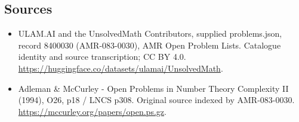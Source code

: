 \documentclass[11pt,a4paper]{article}
\begin{document}
\subsection{Sources}
\begin{itemize}
\item[S1] ULAM.AI and the UnsolvedMath Contributors, supplied problems.json, record 8400030 (AMR-083-0030), AMR Open Problem Lists. Catalogue identity and source transcription; CC BY 4.0.
\url{https://huggingface.co/datasets/ulamai/UnsolvedMath}.
\item[S2] Adleman \& McCurley - Open Problems in Number Theory Complexity II (1994), O26, p18 / LNCS p308. Original source indexed by AMR-083-0030.
\url{https://mccurley.org/papers/open.ps.gz}.
\end{itemize}
\end{document}
